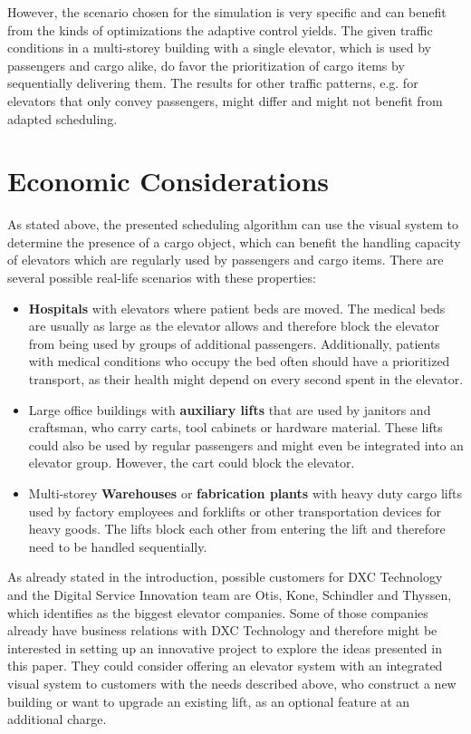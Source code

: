However, the scenario chosen for the simulation is very specific and can benefit from the kinds of optimizations the adaptive control yields. 
The given traffic conditions in a multi-storey building with a single elevator, 
which is used by passengers and cargo alike, 
do favor the prioritization of cargo items by sequentially delivering them.
The results for other traffic patterns, e.g. for elevators that only convey passengers,
might differ and might not benefit from adapted scheduling.

\section{Economic Considerations}
As stated above, the presented scheduling algorithm can use the visual system to determine the presence of a cargo object, which can benefit the handling capacity of elevators which are regularly used by passengers and cargo items.
There are several possible real-life scenarios with these properties:
\begin{itemize}
    \item \textbf{Hospitals} with elevators where patient beds are moved. The medical beds are usually as large as the elevator allows and therefore block the elevator from being used by groups of additional passengers. Additionally, patients with medical conditions who occupy the bed often should have a prioritized transport, as their health might depend on every second spent in the elevator. 
    \item Large office buildings with \textbf{auxiliary lifts} that are used by janitors and craftsman, who carry carts, tool cabinets or hardware material. These lifts could also be used by regular passengers and might even be integrated into an elevator group. However, the cart could block the elevator.
    \item Multi-storey \textbf{Warehouses} or \textbf{fabrication plants} with heavy duty cargo lifts used 
    by factory employees and forklifts or other transportation devices for heavy goods. The lifts block each other from entering the lift and therefore need to be handled sequentially. 
\end{itemize}

As already stated in the introduction, possible customers for DXC Technology and the Digital Service Innovation team are Otis, Kone, Schindler and Thyssen, which \textcite[][p.~4]{unger2015aufzuege} identifies as the biggest elevator companies. Some of those companies already have business relations with DXC Technology and therefore might be interested in setting up an innovative project to explore the ideas presented in this paper.
They could consider offering an elevator system with an integrated visual system to customers with the needs described above, who construct a new building or want to upgrade an existing lift, as an optional feature at an additional charge.

